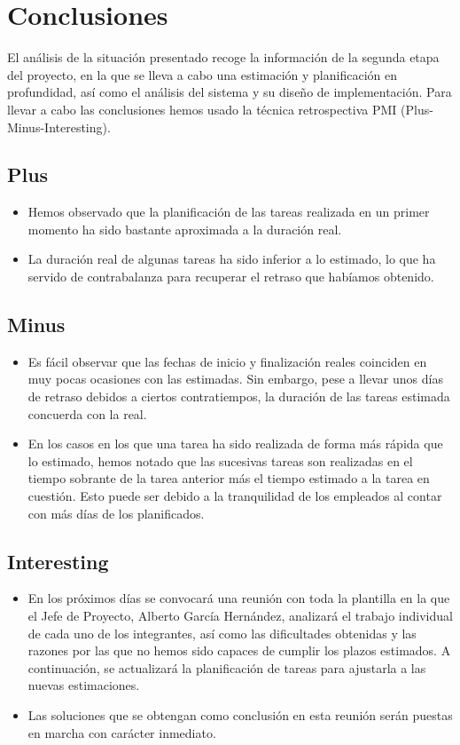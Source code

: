 \section{Conclusiones}
\par El análisis de la situación presentado recoge la información de la segunda etapa del proyecto, en la que se lleva a cabo una estimación y planificación en profundidad, así como el análisis del sistema y su diseño de implementación. Para llevar a cabo las conclusiones hemos usado la técnica retrospectiva PMI (Plus-Minus-Interesting).

\subsection{Plus}
\begin{itemize}
  \item Hemos observado que la planificación de las tareas realizada en un primer momento ha sido bastante aproximada a la duración real.
  \item La duración real de algunas tareas ha sido inferior a lo estimado, lo que ha servido de contrabalanza para recuperar el retraso que habíamos obtenido.
\end{itemize}

\subsection{Minus}
\begin{itemize}
  \item Es fácil observar que las fechas de inicio y finalización reales coinciden en muy pocas ocasiones con las estimadas. Sin embargo, pese a llevar unos días de retraso debidos a ciertos contratiempos, la duración de las tareas estimada concuerda con la real.
  \item En los casos en los que una tarea ha sido realizada de forma más rápida que lo estimado, hemos notado que las sucesivas tareas son realizadas en el tiempo sobrante de la tarea anterior más el tiempo estimado a la tarea en cuestión. Esto puede ser debido a la tranquilidad de los empleados al contar con más días de los planificados.
\end{itemize}

\subsection{Interesting}
\begin{itemize}
  \item En los próximos días se convocará una reunión con toda la plantilla en la que el Jefe de Proyecto, Alberto García Hernández, analizará el trabajo individual de cada uno de los integrantes, así como las dificultades obtenidas y las razones por las que no hemos sido capaces de cumplir los plazos estimados. A continuación, se actualizará la planificación de tareas para ajustarla a las nuevas estimaciones.
  \item Las soluciones que se obtengan como conclusión en esta reunión serán puestas en marcha con carácter inmediato.
\end{itemize}
